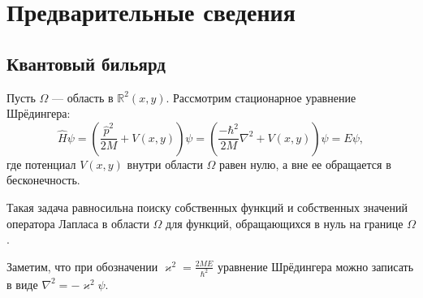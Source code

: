 \chapter{Предварительные сведения}\label{ch:ch1}

\section{Квантовый бильярд}\label{sec:ch1/sec1}
Пусть $\Omega$ --- область в $\mathbb{R}^2(x,y)$. Рассмотрим стационарное уравнение Шрёдингера:
\begin{equation*}
\hat{H}\psi = \left(\frac{\hat{p}^2}{2M} + V(x,y)\right) \psi = \left( \frac{-\hbar^2}{2M}\nabla^2 + V(x, y)\right) \psi = E\psi,
\label{eq:schrodinger}
\end{equation*}
где потенциал $V(x,y)$ внутри области $\Omega$ равен нулю, а вне ее обращается в бесконечность. 

\begin{remark}
Такая задача равносильна поиску собственных функций и собственных значений оператора Лапласа в области $\Omega$ для функций, обращающихся в нуль на границе $\Omega$. 
\label{rem:schrodinger_equivalent}
\end{remark}

Заметим, что при обозначении $\varkappa^2 = \frac{2 M E}{\hbar^2}$ уравнение Шрёдингера можно записать в виде $\nabla^2  = -\varkappa^2 \psi$.

